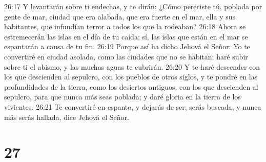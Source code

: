 26:17 Y levantarán sobre ti endechas, y te dirán: ¿Cómo pereciste tú, poblada por gente de mar, ciudad que era alabada, que era fuerte en el mar, ella y sus habitantes, que infundían terror a todos los que la rodeaban?  
26:18 Ahora se estremecerán las islas en el día de tu caída; sí, las islas que están en el mar se espantarán a causa de tu fin. 
26:19 Porque así ha dicho Jehová el Señor: Yo te convertiré en ciudad asolada, como las ciudades que no se habitan; haré subir sobre ti el abismo, y las muchas aguas te cubrirán.  
26:20 Y te haré descender con los que descienden al sepulcro, con los pueblos de otros siglos, y te pondré en las profundidades de la tierra, como los desiertos antiguos, con los que descienden al sepulcro, para que nunca más seas poblada; y daré gloria en la tierra de los vivientes.  
26:21 Te convertiré en espanto, y dejarás de ser; serás buscada, y nunca más serás hallada, dice Jehová el Señor. 
  

\chapter{27}


